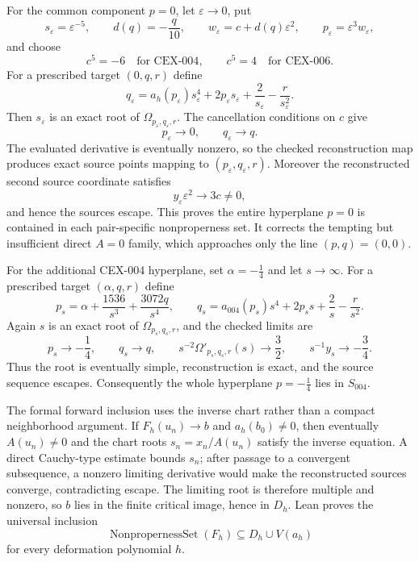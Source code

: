 \documentclass[11pt]{article}
\begin{document}
For the common component $p=0$, let $\varepsilon\to0$, put
\[
 s_\varepsilon=\varepsilon^{-5},
 \qquad
 d(q)=-\frac{q}{10},
 \qquad
 w_\varepsilon=c+d(q)\varepsilon^2,
 \qquad
 p_\varepsilon=\varepsilon^3w_\varepsilon,
\]
and choose
\[
 c^5=-6 \quad\text{for CEX-004},
 \qquad
 c^5=4 \quad\text{for CEX-006}.
\]
For a prescribed target $(0,q,r)$ define
\[
 q_\varepsilon
 =a_h(p_\varepsilon)s_\varepsilon^4
   +2p_\varepsilon s_\varepsilon
   +\frac{2}{s_\varepsilon}
   -\frac{r}{s_\varepsilon^2}.
\]
Then $s_\varepsilon$ is an exact root of
$\Omega_{p_\varepsilon,q_\varepsilon,r}$.  The cancellation conditions on
$c$ give
\[
 p_\varepsilon\longrightarrow0,
 \qquad
 q_\varepsilon\longrightarrow q.
\]
The evaluated derivative is eventually nonzero, so the checked reconstruction
map produces exact source points mapping to
$(p_\varepsilon,q_\varepsilon,r)$.  Moreover the reconstructed second source
coordinate satisfies
\[
 y_\varepsilon\varepsilon^2\longrightarrow3c\ne0,
\]
and hence the sources escape.  This proves the entire hyperplane $p=0$ is
contained in each pair-specific nonproperness set.  It corrects the tempting
but insufficient direct $A=0$ family, which approaches only the line
$(p,q)=(0,0)$.

For the additional CEX-004 hyperplane, set $\alpha=-\frac14$ and let
$s\to\infty$.  For a prescribed target $(\alpha,q,r)$ define
\[
 p_s=\alpha+\frac{1536}{s^3}+\frac{3072q}{s^4},
 \qquad
 q_s=a_{004}(p_s)s^4+2p_ss+\frac2s-\frac{r}{s^2}.
\]
Again $s$ is an exact root of $\Omega_{p_s,q_s,r}$, and the checked limits are
\[
 p_s\longrightarrow-\frac14,
 \qquad
 q_s\longrightarrow q,
 \qquad
 s^{-2}\Omega'_{p_s,q_s,r}(s)\longrightarrow\frac32,
 \qquad
 s^{-1}y_s\longrightarrow-\frac34.
\]
Thus the root is eventually simple, reconstruction is exact, and the source
sequence escapes.  Consequently the whole hyperplane $p=-\frac14$ lies in
$S_{004}$.

The formal forward inclusion uses the inverse chart rather than a compact
neighborhood argument.  If $F_h(u_n)\to b$ and $a_h(b_0)\ne0$, then eventually
$A(u_n)\ne0$ and the chart roots
$s_n=x_n/A(u_n)$ satisfy the inverse equation.  A direct Cauchy-type estimate
bounds $s_n$; after passage to a convergent subsequence, a nonzero limiting
derivative would make the reconstructed sources converge, contradicting
escape.  The limiting root is therefore multiple and nonzero, so $b$ lies in
the finite critical image, hence in $D_h$.  Lean proves the universal inclusion
\[
 \operatorname{NonpropernessSet}(F_h)
 \subseteq D_h\cup V(a_h)
\]
for every deformation polynomial $h$.
\end{document}
